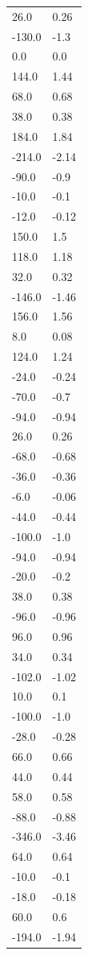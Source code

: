 \begin{longtable}{ll}
26.0 & 0.26 \\
-130.0 & -1.3 \\
0.0 & 0.0 \\
144.0 & 1.44 \\
68.0 & 0.68 \\
38.0 & 0.38 \\
184.0 & 1.84 \\
-214.0 & -2.14 \\
-90.0 & -0.9 \\
-10.0 & -0.1 \\
-12.0 & -0.12 \\
150.0 & 1.5 \\
118.0 & 1.18 \\
32.0 & 0.32 \\
-146.0 & -1.46 \\
156.0 & 1.56 \\
8.0 & 0.08 \\
124.0 & 1.24 \\
-24.0 & -0.24 \\
-70.0 & -0.7 \\
-94.0 & -0.94 \\
26.0 & 0.26 \\
-68.0 & -0.68 \\
-36.0 & -0.36 \\
-6.0 & -0.06 \\
-44.0 & -0.44 \\
-100.0 & -1.0 \\
-94.0 & -0.94 \\
-20.0 & -0.2 \\
38.0 & 0.38 \\
-96.0 & -0.96 \\
96.0 & 0.96 \\
34.0 & 0.34 \\
-102.0 & -1.02 \\
10.0 & 0.1 \\
-100.0 & -1.0 \\
-28.0 & -0.28 \\
66.0 & 0.66 \\
44.0 & 0.44 \\
58.0 & 0.58 \\
-88.0 & -0.88 \\
-346.0 & -3.46 \\
64.0 & 0.64 \\
-10.0 & -0.1 \\
-18.0 & -0.18 \\
60.0 & 0.6 \\
-194.0 & -1.94 \\

\end{longtable}
